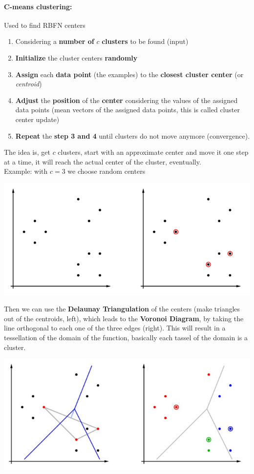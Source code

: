 \newpage

\paragraph{C-means clustering:} Used to find RBFN centers
\begin{enumerate}
	\item Considering a \textbf{number of} $c$ \textbf{clusters} to be found (input)
	
	\item \textbf{Initialize} the cluster centers \textbf{randomly}
	
	\item \textbf{Assign} each \textbf{data point} (the examples) to the \textbf{closest cluster center} (or \textit{centroid})
	
	\item \textbf{Adjust} the \textbf{position} of the \textbf{center} considering the values of the assigned data points (mean vectors of the assigned data points, this is called cluster center update)
	
	\item \textbf{Repeat} the \textbf{step 3 and 4} until clusters do not move anymore (convergence).
\end{enumerate}
The idea is, get $c$ clusters, start with an approximate center and move it one step at a time, it will reach the actual center of the cluster, eventually.\\

Example: with $c=3$ we choose random centers
\begin{center}
	\includegraphics[width=0.65\columnwidth]{img/NN/clustering1}
\end{center}
Then we can use the \textbf{Delaunay Triangulation} of the centers (make triangles out of the centroids, left), which leads to the \textbf{Voronoi Diagram}, by taking the line orthogonal to each one of the three edges (right). This will result in a tessellation of the domain of the function, basically each tassel of the domain is a cluster.
\begin{center}
	\includegraphics[width=0.65\columnwidth]{img/NN/clustering2}
\end{center}

